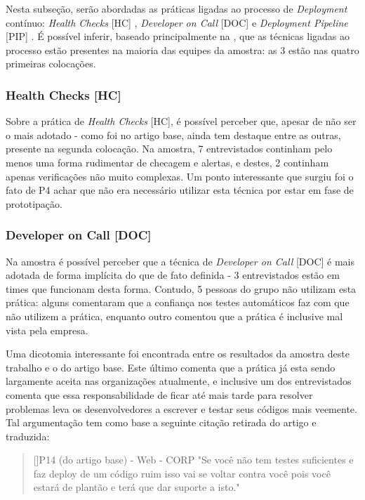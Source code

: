 Nesta subseção, serão abordadas as práticas ligadas ao processo de \emph{Deployment} contínuo: \emph{Health Checks} [HC] \cite{devopsBook}, \emph{Developer on Call} [DOC] \cite{devAndDeploymentFB} e \emph{Deployment Pipeline} [PIP] \cite{devopsBook}. É possível inferir, baseado principalmente na , que as técnicas ligadas ao processo estão presentes na maioria das equipes da amostra: as 3 estão nas quatro primeiras colocações. 

\subsubsection{Health Checks [HC]}

Sobre a prática de \emph{Health Checks} [HC], é possível perceber que, apesar de não ser o mais adotado - como foi no artigo base, ainda tem destaque entre as outras, presente na segunda colocação. Na amostra, 7 entrevistados continham pelo menos uma forma rudimentar de checagem e alertas, e destes, 2 continham apenas verificações não muito complexas. Um ponto interessante que surgiu foi o fato de P4 achar que não era necessário utilizar esta técnica por estar em fase de prototipação.

\subsubsection{Developer on Call [DOC]}

Na amostra é possível perceber que a técnica de \emph{Developer on Call} [DOC] é mais adotada de forma implícita do que de fato definida - 3 entrevistados estão em times que funcionam desta forma. Contudo, 5 pessoas do grupo não utilizam esta prática: alguns comentaram que a confiança nos testes automáticos faz com que não utilizem a prática, enquanto outro comentou que a prática é inclusive mal vista pela empresa.

Uma dicotomia interessante foi encontrada entre os resultados da amostra deste trabalho e o do artigo base. Este último comenta que a prática já esta sendo largamente aceita nas organizações atualmente, e inclusive um dos entrevistados comenta que essa responsabilidade de ficar até mais tarde para resolver problemas leva os desenvolvedores a escrever e testar seus códigos mais veemente. Tal argumentação tem como base a seguinte citação retirada do artigo e traduzida:

\begin{quotation}[]{P14 (do artigo base) - Web - CORP}
    "Se você não tem testes suficientes e faz deploy de um código ruim isso vai se voltar contra você pois você estará de plantão e terá que dar suporte a isto."
\end{quotation}

